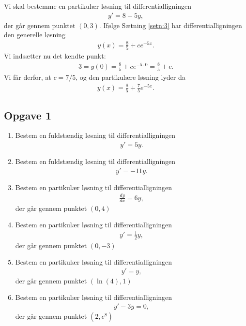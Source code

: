 \begin{exa}
	Vi skal bestemme en partikulær løsning til differentialligningen	
	\begin{align*}
		y' = 8-5y,
	\end{align*}
	der går gennem punktet $(0,3)$. Ifølge Sætning \ref{setn:3} har differentialligningen den generelle løsning
	\begin{align*}
		y(x) = \frac{8}{5} + ce^{-5x}.
	\end{align*}
	Vi indsætter nu det kendte punkt:
	\begin{align*}
		3=y(0) = \frac{8}{5} + ce^{-5\cdot 0} = \frac{8}{5}+ c. 
	\end{align*}
	Vi får derfor, at $c = 7/5$, og den partikulære løsning lyder da
	\begin{align*}
		y(x) = \frac{8}{5} + \frac{7}{5}e^{-5x}.
	\end{align*}
\end{exa}

\subsection*{Opgave 1}
\begin{enumerate}[label=\roman*)]
	\item Bestem en fuldstændig løsning til differentialligningen
	\begin{align*}
		y' = 5y.
	\end{align*} 
	\item Bestem en fuldstændig løsning til differentialligningen
	\begin{align*}
		y' = -11y.
	\end{align*}
	\item Bestem en partikulær løsning til differentialligningen
	\begin{align*}
		\frac{d y}{d x} = 6y,
	\end{align*}
	der går gennem punktet $(0,4)$
	\item Bestem en partikulær løsning til differentialligningen
	\begin{align*}
		y' = \frac{1}{2}y,
	\end{align*}
	der går gennem punktet $(0,-3)$
	\item Bestem en partikulær løsning til differentialligningen
	\begin{align*}
		y' = y,
	\end{align*}
	der går gennem punktet $(\ln(4),1)$
	\item Bestem en partikulær løsning til differentialligningen
	\begin{align*}
		y' - 3y = 0,
	\end{align*}
	der går gennem punktet $(2,e^8)$
\end{enumerate}
